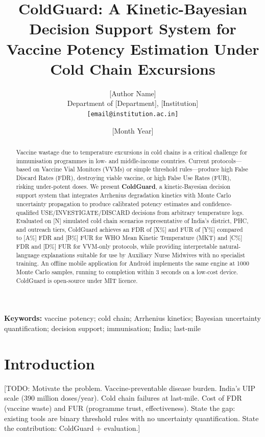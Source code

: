 \documentclass[12pt,a4paper]{article}
\title{%
  \textbf{ColdGuard: A Kinetic-Bayesian Decision Support System for \\
  Vaccine Potency Estimation Under Cold Chain Excursions}%
}
\author{
  [Author Name] \\
  Department of [Department], [Institution] \\
  \texttt{[email@institution.ac.in]}
}
\date{[Month Year]}
\begin{document}
\maketitle

\begin{abstract}
Vaccine wastage due to temperature excursions in cold chains is a critical
challenge for immunisation programmes in low- and middle-income countries.
Current protocols---based on Vaccine Vial Monitors (VVMs) or simple threshold
rules---produce high False Discard Rates (FDR), destroying viable vaccine, or
high False Use Rates (FUR), risking under-potent doses. We present
\textbf{ColdGuard}, a kinetic-Bayesian decision support system that integrates
Arrhenius degradation kinetics with Monte Carlo uncertainty propagation to
produce calibrated potency estimates and confidence-qualified USE/INVES\-TIGATE/DISCARD
decisions from arbitrary temperature logs. Evaluated on [N] simulated cold chain
scenarios representative of India's district, PHC, and outreach tiers, ColdGuard
achieves an FDR of [X\%] and FUR of [Y\%] compared to [A\%] FDR and [B\%] FUR
for WHO Mean Kinetic Temperature (MKT) and [C\%] FDR and [D\%] FUR for VVM-only
protocols, while providing interpretable natural-language explanations suitable
for use by Auxiliary Nurse Midwives with no specialist training. An offline
mobile application for Android implements the same engine at 1000 Monte Carlo
samples, running to completion within 3 seconds on a low-cost device. ColdGuard
is open-source under MIT licence.
\end{abstract}

\textbf{Keywords:} vaccine potency; cold chain; Arrhenius kinetics; Bayesian
uncertainty quantification; decision support; immunisation; India; last-mile

\tableofcontents
\newpage

\section{Introduction}
\label{sec:introduction}

[TODO: Motivate the problem. Vaccine-preventable disease burden. India's UIP
scale (390 million doses/year). Cold chain failures at last-mile. Cost of FDR
(vaccine waste) and FUR (programme trust, effectiveness). State the gap:
existing tools are binary threshold rules with no uncertainty quantification.
State the contribution: ColdGuard + evaluation.]
\end{document}
